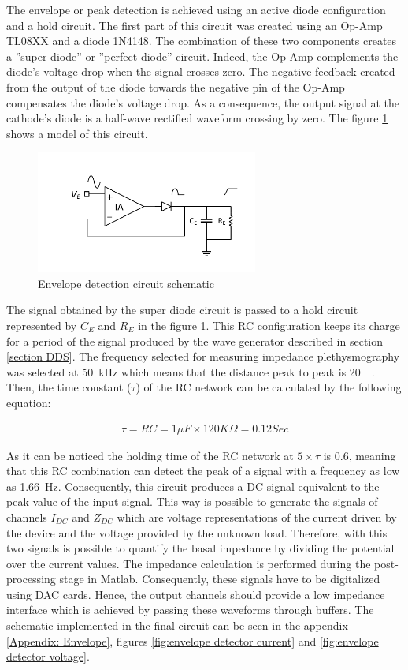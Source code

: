 The envelope or peak detection is achieved using an active diode configuration and a hold circuit. The first part of this circuit was created using an Op-Amp TL08XX\cite{ti:TL08xx} and a diode 1N4148. The combination of these two components creates a ''super diode'' or ''perfect diode'' circuit. Indeed, the Op-Amp complements the diode's voltage drop when the signal crosses zero. The negative feedback created from the output of the diode towards the negative pin of the Op-Amp compensates the diode's voltage drop. As a consequence, the output signal at the cathode's diode is a half-wave rectified waveform crossing by zero. The figure \ref{fig:envelope} shows a model of this circuit. 

\begin{figure}[!htpb]
	\centering
	\includegraphics[width=7.3cm,keepaspectratio]{figure5}
 	\caption{Envelope detection circuit schematic}
    \label{fig:envelope}
\end{figure}

The signal obtained by the super diode circuit is passed to a hold circuit represented by $C_E$ and $R_E$ in the figure \ref{fig:envelope}. This RC configuration keeps its charge for a period of the signal produced by the wave generator described in section \ref{section DDS}. The frequency selected for measuring impedance plethysmography was selected at \SI{50}{\kHz} which means that the distance peak to peak is \SI{20}{\micro\sec}. Then, the time constant ($\tau$) of the RC network can be calculated by the following equation:

\begin{align}
\tau = RC = 1 \mu F \times 120K\Omega = 0.12 Sec
\end{align}

As it can be noticed the holding time of the RC network at $5\times\tau$ is \SI{0.6}{\sec}, meaning that this RC combination can detect the peak of a signal with a frequency as low as \SI{1.66}{\hertz}. Consequently, this circuit produces a DC signal equivalent to the peak value of the input signal. This way is possible to generate the signals of channels $I_{DC}$ and $Z_{DC}$ which are voltage representations of the current driven by the device and the voltage provided by the unknown load. Therefore, with this two signals is possible to quantify the basal impedance by dividing the potential over the current values. The impedance calculation is performed during the post-processing stage in Matlab. Consequently, these signals have to be digitalized using DAC cards. Hence, the output channels should provide a low impedance interface which is achieved by passing these waveforms through buffers. The schematic implemented in the final circuit can be seen in the appendix \ref{Appendix: Envelope}, figures \ref{fig:envelope detector current} and \ref{fig:envelope detector voltage}.

